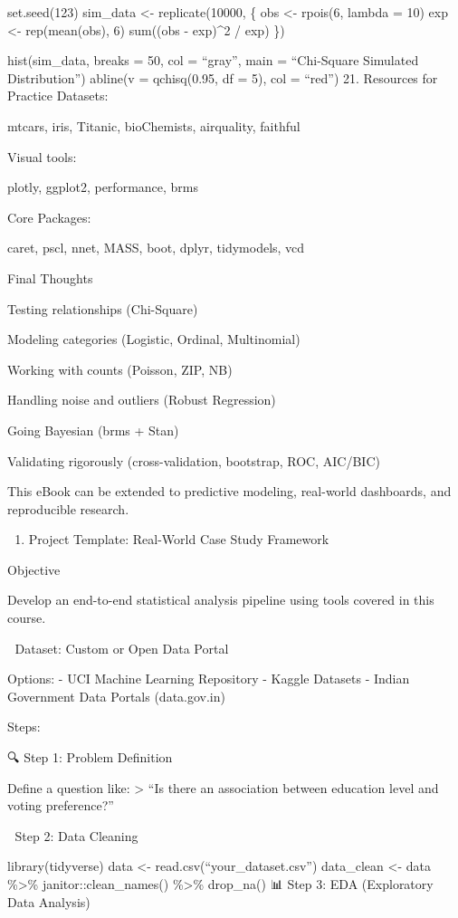 \documentclass[
  letterpaper,
  DIV=11,
  numbers=noendperiod]{scrreprt}
\providecommand{\tightlist}{%
  \setlength{\itemsep}{0pt}\setlength{\parskip}{0pt}}
\begin{document}
{set.seed(123) sim\_data \textless- replicate(10000, \{ obs \textless-
rpois(6, lambda = 10) exp \textless- rep(mean(obs), 6) sum((obs -
exp)\^{}2 / exp) \})

hist(sim\_data, breaks = 50, col = ``gray'', main = ``Chi-Square
Simulated Distribution'') abline(v = qchisq(0.95, df = 5), col =
``red'') 21. Resources for Practice Datasets:

mtcars, iris, Titanic, bioChemists, airquality, faithful

Visual tools:

plotly, ggplot2, performance, brms

Core Packages:

caret, pscl, nnet, MASS, boot, dplyr, tidymodels, vcd

Final Thoughts

Testing relationships (Chi-Square)

Modeling categories (Logistic, Ordinal, Multinomial)

Working with counts (Poisson, ZIP, NB)

Handling noise and outliers (Robust Regression)

Going Bayesian (brms + Stan)

Validating rigorously (cross-validation, bootstrap, ROC, AIC/BIC)

This eBook can be extended to predictive modeling, real-world
dashboards, and reproducible research.

\begin{enumerate}
\def\labelenumi{\arabic{enumi}.}
\setcounter{enumi}{22}
\tightlist
\item
  Project Template: Real-World Case Study Framework
\end{enumerate}

Objective

Develop an end-to-end statistical analysis pipeline using tools covered
in this course.

📁 Dataset: Custom or Open Data Portal

Options: - UCI Machine Learning Repository - Kaggle Datasets - Indian
Government Data Portals (data.gov.in)

Steps:

🔍 Step 1: Problem Definition

Define a question like: \textgreater{} ``Is there an association between
education level and voting preference?''

🧹 Step 2: Data Cleaning

library(tidyverse) data \textless- read.csv(``your\_dataset.csv'')
data\_clean \textless- data \%\textgreater\% janitor::clean\_names()
\%\textgreater\% drop\_na() 📊 Step 3: EDA (Exploratory Data Analysis)

}
\end{document}
